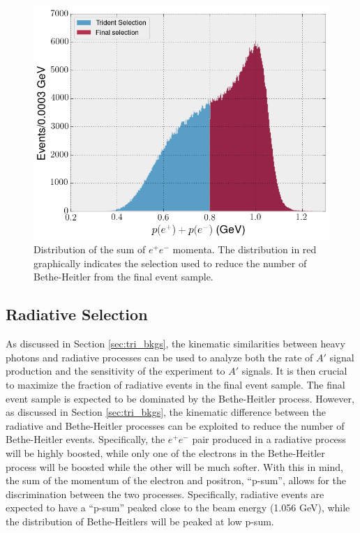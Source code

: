 \begin{figure}[ht]
    \centering
    \includegraphics[width=\textwidth]{images/psum.png}
    \caption{Distribution of the sum of $e^+e^-$ momenta.  The distribution in 
             red graphically indicates the selection used to reduce the number
             of Bethe-Heitler from the final event sample.}
    \label{fig:p_sum}
\end{figure}  

\subsection{Radiative Selection}

As discussed in Section \ref{sec:tri_bkgs}, the kinematic similarities between
heavy photons and
radiative processes can be used to analyze both the rate of $A'$ signal production
and the sensitivity of the experiment to $A'$ signals.  It is then crucial to
maximize the fraction of radiative events in the final event sample.  The final
event sample is expected to be dominated by the Bethe-Heitler process.  However,
as discussed in Section \ref{sec:tri_bkgs}, 
the kinematic difference between the radiative and Bethe-Heitler processes can 
be exploited to reduce the number of Bethe-Heitler events.  Specifically, the 
$e^+e^-$ pair produced in a radiative process will be highly boosted, while 
only one of the electrons in the Bethe-Heitler process will be boosted 
while the other will be much softer.  With this in mind, the sum of the momentum
of the electron and positron, ``p-sum'', allows for the discrimination between the two processes.
Specifically, radiative events are expected to have a ``p-sum'' peaked 
close to the beam energy (1.056 GeV), while the distribution of Bethe-Heitlers 
will be peaked at low p-sum.

